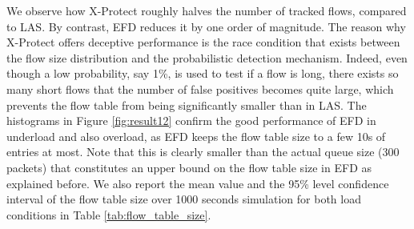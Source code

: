 \documentclass[preprint,12pt]{elsarticle}
\begin{document}
We observe how X-Protect roughly halves the number of tracked flows, compared to LAS. By contrast, EFD reduces it by one order of magnitude. The reason why X-Protect offers deceptive performance is the race condition that exists between the flow size distribution and the probabilistic detection mechanism. Indeed, even though a low probability, say 1\%, is used to test if a flow is long, there exists so many short flows that the number of false positives becomes quite large, which prevents the flow table from being significantly smaller than in LAS. The histograms in Figure \ref{fig:result12} confirm the good performance of EFD in underload and also overload, as EFD keeps the flow table size to a few 10s of entries at most. Note that this is clearly smaller than the actual queue size (300 packets) that constitutes an upper bound on the flow table size in EFD as explained before. We also report the mean value and the 95\% level confidence interval of the flow table size over 1000 seconds simulation for both load conditions in Table \ref{tab:flow_table_size}. 


\end{document}
